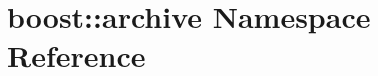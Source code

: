 \hypertarget{namespaceboost_1_1archive}{}\section{boost\+:\+:archive Namespace Reference}
\label{namespaceboost_1_1archive}
